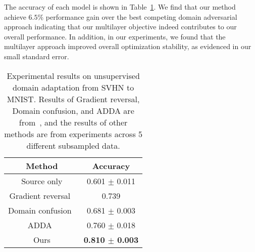 %
The accuracy of each model is shown in Table~\ref{ablation}. We find that our method achieve $6.5\%$ performance gain over the best competing domain adversarial approach indicating that our multilayer objective indeed contributes to our overall performance. In addition, in our experiments, we found that the multilayer approach improved overall optimization stability, as evidenced in our small standard error.

\begin{table}[htbp]
\centering
\caption{Experimental results on unsupervised domain adaptation from SVHN to MNIST. Results of Gradient reversal, Domain confusion, and ADDA are from~\cite{tzeng2017adversarial}, and the results of other methods are from experiments across 5 different subsampled data.}
\begin{tabular}{|c|c|}
\hline
\textbf{Method} & \textbf{Accuracy}\\
\hline
\hline
\hline
Source only & 0.601 $\pm$ 0.011\\
\hline
Gradient reversal~\cite{ganin2016domain} & 0.739\\
\hline
Domain confusion~\cite{tzeng2015simultaneous} & 0.681 $\pm$ 0.003\\
\hline
 ADDA~\cite{tzeng2017adversarial} & 0.760 $\pm$ 0.018\\
\hline
\hline
Ours & \textbf{0.810 $\pm$ 0.003}\\
\hline
\end{tabular}

\label{ablation}
\end{table}



